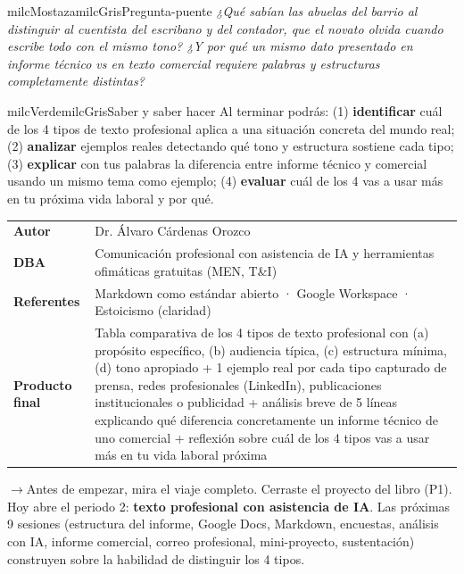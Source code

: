 \documentclass[11pt,letterpaper]{article}
\newcommand{\puente}[1]{%
  \begin{puentebox}%
    \textcolor{milcGradeDark}{$\rightarrow$}\hspace{2mm}#1%
  \end{puentebox}%
}
\begin{document}
\begin{softbox}{milcMostaza}{milcGris}{Pregunta-puente}
\textit{¿Qué sabían las abuelas del barrio al distinguir al cuentista del escribano y del contador, que el novato olvida cuando escribe todo con el mismo tono? ¿Y por qué un mismo dato presentado en informe técnico vs en texto comercial requiere palabras y estructuras completamente distintas?}
\end{softbox}

\begin{softbox}{milcVerde}{milcGris}{Saber y saber hacer}
Al terminar podrás: (1) \textbf{identificar} cuál de los 4 tipos de texto profesional aplica a una situación concreta del mundo real; (2) \textbf{analizar} ejemplos reales detectando qué tono y estructura sostiene cada tipo; (3) \textbf{explicar} con tus palabras la diferencia entre informe técnico y comercial usando un mismo tema como ejemplo; (4) \textbf{evaluar} cuál de los 4 vas a usar más en tu próxima vida laboral y por qué.
\end{softbox}



\small
\begin{tabularx}{\textwidth}{>{\bfseries}p{3.0cm}Y}
Autor & Dr. Álvaro Cárdenas Orozco\\
DBA & Comunicación profesional con asistencia de IA y herramientas ofimáticas gratuitas (MEN, T\&I)\\
Referentes & Markdown como estándar abierto · Google Workspace · Estoicismo (claridad)\\
Producto final & Tabla comparativa de los 4 tipos de texto profesional con (a) propósito específico, (b) audiencia típica, (c) estructura mínima, (d) tono apropiado + 1 ejemplo real por cada tipo capturado de prensa, redes profesionales (LinkedIn), publicaciones institucionales o publicidad + análisis breve de 5 líneas explicando qué diferencia concretamente un informe técnico de uno comercial + reflexión sobre cuál de los 4 tipos vas a usar más en tu vida laboral próxima\\
\end{tabularx}
\normalsize

\puente{Antes de empezar, mira el viaje completo. Cerraste el proyecto del libro (P1). Hoy abre el periodo 2: \textbf{texto profesional con asistencia de IA}. Las próximas 9 sesiones (estructura del informe, Google Docs, Markdown, encuestas, análisis con IA, informe comercial, correo profesional, mini-proyecto, sustentación) construyen sobre la habilidad de distinguir los 4 tipos.}
\end{document}
